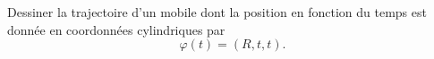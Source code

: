 
\begin{exercice}\label{exoOutilsMath-0006}

	Dessiner la trajectoire d'un mobile dont la position en fonction du temps est donnée en coordonnées cylindriques par
	\begin{equation}
		\varphi(t)=(R,t,t).
	\end{equation}

\end{exercice}
